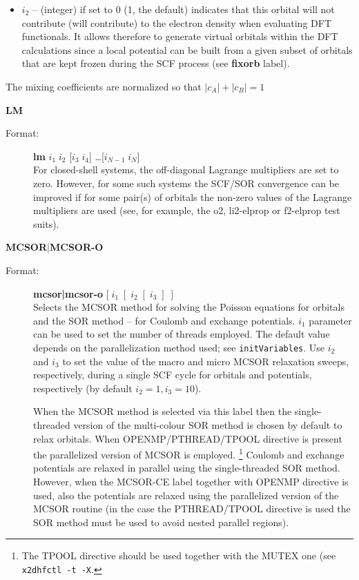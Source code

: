 \documentclass[10pt,a4paper]{article}
\newcommand{\ft}[1]{\texttt{#1}}
\newcommand{\fb}[1]{\textbf{#1}}
\begin{document}
\begin{description}
\begin{description}
\begin{description}
\begin{itemize}
\item[] $i_2$ -- (integer) if set to 0 (1, the default) indicates that this
  orbital will not contribute (will contribute) to the electron density
  when evaluating DFT functionals. It allows therefore to generate
  virtual orbitals within the DFT calculations since a local potential can
  be built from a given subset of orbitals that are kept frozen during the
  SCF process (see \fb{fixorb} label).

\end{itemize}
The mixing coefficients are normalized so that $|c_A|+|c_B|=1$

\end{description}
\end{description}

\item \textbf{LM}
\begin{description}
\item[Format:] \textbf{lm} $i_1 \; i_2$ [\;$i_3 \;i_4$\;] \ldots [\;$i_{N-1} \;i_{N}$\;] \\
  For closed-shell systems, the off-diagonal Lagrange multipliers are set to
  zero. However, for some such systems the SCF/SOR convergence can be
  improved if for some pair(s) of orbitals the non-zero values of the
  Lagrange multipliers are used (see, for example, the o2, li2-elprop or
  f2-elprop test suits).
\end{description}

\newpage

\item \textbf{MCSOR$|$MCSOR-O}
\begin{description}
\item[Format:] \textbf{mcsor|mcsor-o} $[\;i_1\;[\;i_2\;[\;i_3\;]\;]$\\
  Selects the MCSOR method for solving the Poisson equations for orbitals
  and the SOR method -- for Coulomb and exchange potentials. $i_1$
  parameter can be used to set the number of threads employed. The default
  value depends on the parallelization method used; see
  \ft{initVariables}. Use $i_2$ and $i_3$ to set the value of the 
  macro and micro MCSOR relaxation sweeps, respectively, during a single SCF
  cycle for orbitals and potentials, respectively (by default
  $i_2=1, i_3=10$).

  When the MCSOR method is selected via this label then the single-threaded
  version of the multi-colour SOR method is chosen by default to relax
  orbitals. When OPENMP/PTHREAD/TPOOL directive is present the parallelized
  version of MCSOR is employed.%
  \footnote{The TPOOL directive should be used together with the MUTEX one
    (see \ft{x2dhfctl -t -X}.}  Coulomb and exchange potentials are relaxed
  in parallel using the single-threaded SOR method. However, when the
  MCSOR-CE label together with OPENMP directive is used, also the
  potentials are relaxed using the parallelized version of the MCSOR
  routine (in the case the PTHREAD/TPOOL directive is used the SOR method
  must be used to avoid nested parallel regions).


\end{description}
\end{description}
\end{document}
